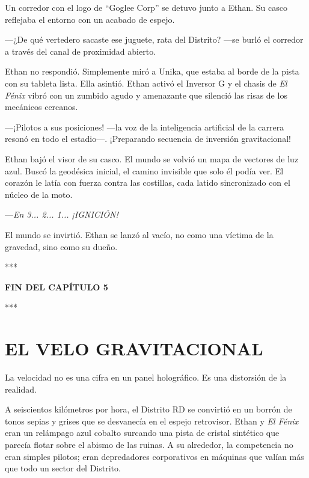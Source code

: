 \documentclass[11pt,twoside]{book}
\begin{document}
Un corredor con el logo de ``Goglee Corp'' se detuvo junto a Ethan. Su casco reflejaba el entorno con un acabado de espejo.

---¿De qué vertedero sacaste ese juguete, rata del Distrito? ---se burló el corredor a través del canal de proximidad abierto.

Ethan no respondió. Simplemente miró a Unika, que estaba al borde de la pista con su tableta lista. Ella asintió. Ethan activó el Inversor G y el chasis de \textit{El Fénix} vibró con un zumbido agudo y amenazante que silenció las risas de los mecánicos cercanos.

---¡Pilotos a sus posiciones! ---la voz de la inteligencia artificial de la carrera resonó en todo el estadio---. ¡Preparando secuencia de inversión gravitacional!

Ethan bajó el visor de su casco. El mundo se volvió un mapa de vectores de luz azul. Buscó la geodésica inicial, el camino invisible que solo él podía ver. El corazón le latía con fuerza contra las costillas, cada latido sincronizado con el núcleo de la moto.

---\textit{En 3... 2... 1... ¡IGNICIÓN!}

El mundo se invirtió. Ethan se lanzó al vacío, no como una víctima de la gravedad, sino como su dueño.

\bigskip
\begin{center}***\end{center}
\bigskip

\textbf{FIN DEL CAPÍTULO 5}


\bigskip
\begin{center}***\end{center}
\bigskip

\chapter{EL VELO GRAVITACIONAL}

La velocidad no es una cifra en un panel holográfico. Es una distorsión de la realidad.

A seiscientos kilómetros por hora, el Distrito RD se convirtió en un borrón de tonos sepias y grises que se desvanecía en el espejo retrovisor. Ethan y \textit{El Fénix} eran un relámpago azul cobalto surcando una pista de cristal sintético que parecía flotar sobre el abismo de las ruinas. A su alrededor, la competencia no eran simples pilotos; eran depredadores corporativos en máquinas que valían más que todo un sector del Distrito.
\end{document}
